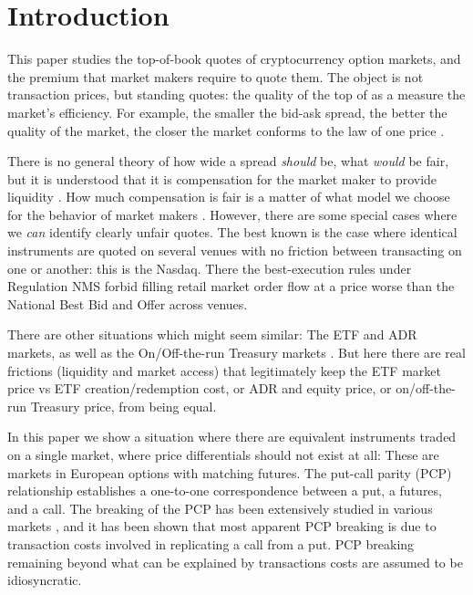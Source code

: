 \documentclass[12pt]{article}
\begin{document}
\tableofcontents

\clearpage
\section{Introduction}
This paper studies the top-of-book quotes of cryptocurrency option markets, and the premium that market makers require to quote them. The object is not transaction prices, but standing quotes: the quality of the top of as a measure the market's efficiency. For example, the smaller the bid-ask spread, the better the quality of the market, the closer the market conforms to the law of one price \citep{demsetz1968cost, amihud1986asset}.

There is no general theory of how wide a spread \textit{should} be, what \textit{would} be fair, but it is understood that it is compensation for the market maker to provide liquidity \citep{demsetz1968cost, ho1981optimal, glosten1985bid}. How much compensation is fair is a matter of what model we choose for the behavior of market makers \citep{ho1981optimal, bollen2004modeling}. However, there are some special cases where we \emph{can} identify clearly unfair quotes. The best known is the case where identical instruments are quoted on several venues with no friction between transacting on one or another: this is the Nasdaq. There the best-execution rules under Regulation NMS \citep{sec_reg_nms_2005} forbid filling retail market order flow at a price worse than the National Best Bid and Offer across venues.

There are other situations which might seem similar: The ETF and ADR markets, as well as the On/Off-the-run Treasury markets \citep{pan2017etf, gagnon2010multimarket, krishnamurthy2002bond}. But here there are real frictions (liquidity and market access) that legitimately keep the ETF market price vs ETF creation/redemption cost, or ADR and equity price, or on/off-the-run Treasury price, from being equal.

In this paper we show a situation where there are equivalent instruments traded on a single market, where price differentials should not exist at all: These are markets in European options with matching futures. The put-call parity (PCP) relationship establishes a one-to-one correspondence between a put, a futures, and a call. The breaking of the PCP has been extensively studied in various markets \citep{klemkosky1979put, kamara1995daily, cremers2010deviations, ofek2004limited}, and it has been shown that most apparent PCP breaking is due to transaction costs involved in replicating a call from a put. PCP breaking remaining beyond what can be explained by transactions costs are assumed to be idiosyncratic. 
\end{document}
